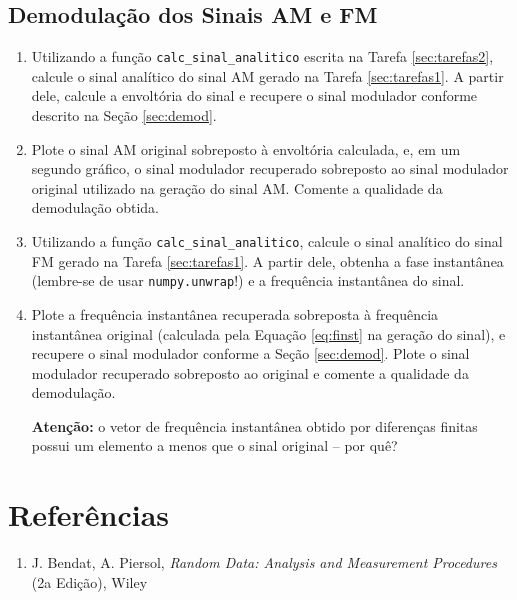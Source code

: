 \documentclass[a4paper,twoside,12pt]{article}
\begin{document}
	
	\subsection{Demodulação dos Sinais AM e FM}
	\label{sec:tarefas3}
	
	\begin{enumerate}
		\item Utilizando a função \texttt{calc\_sinal\_analitico} escrita na Tarefa \ref{sec:tarefas2}, calcule o sinal analítico do sinal AM gerado na Tarefa \ref{sec:tarefas1}. A partir dele, calcule a envoltória do sinal e recupere o sinal modulador conforme descrito na Seção \ref{sec:demod}.
		
		\item Plote o sinal AM original sobreposto à envoltória calculada, e, em um segundo gráfico, o sinal modulador recuperado sobreposto ao sinal modulador original utilizado na geração do sinal AM. Comente a qualidade da demodulação obtida.
	
		\item Utilizando a função \texttt{calc\_sinal\_analitico}, calcule o sinal analítico do sinal FM gerado na Tarefa \ref{sec:tarefas1}. A partir dele, obtenha a fase instantânea (lembre-se de usar \texttt{numpy.unwrap}!) e a frequência instantânea do sinal.
		
		\item Plote a frequência instantânea recuperada sobreposta à frequência instantânea original (calculada pela Equação \eqref{eq:finst} na geração do sinal), e recupere o sinal modulador conforme a Seção \ref{sec:demod}. Plote o sinal modulador recuperado sobreposto ao original e comente a qualidade da demodulação.
		
		\textbf{Atenção:} o vetor de frequência instantânea obtido por diferenças finitas possui um elemento a menos que o sinal original -- por quê?
	\end{enumerate}
	
	
	\section*{Referências}
	
	\begin{enumerate}
		\item J. Bendat, A. Piersol, \emph{Random Data: Analysis and Measurement Procedures} (2a Edição), Wiley
	\end{enumerate}
	
\end{document}
